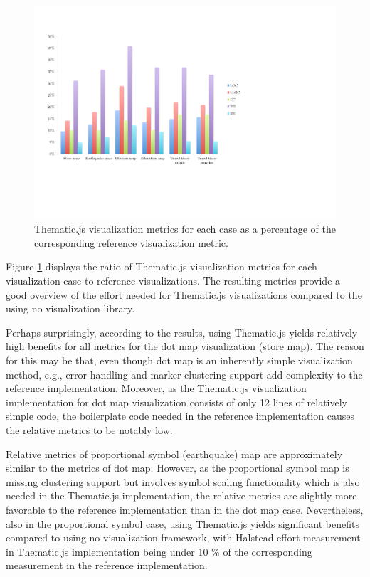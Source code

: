 \begin{figure}[htbp]
  \begin{center}
    \includegraphics[width=\textwidth]{images/evaluation-results.pdf}
    \caption{Thematic.js visualization metrics for each case as a percentage of the corresponding reference visualization metric.}
    \label{fig:evaluationchart}
  \end{center}
\end{figure}

Figure \ref{fig:evaluationchart} displays the ratio of Thematic.js visualization metrics for each visualization case to reference visualizations. The resulting metrics provide a good overview of the effort needed for Thematic.js visualizations compared to the using no visualization library.

Perhaps surprisingly, according to the results, using Thematic.js yields relatively high benefits for all metrics for the dot map visualization (store map). The reason for this may be that, even though dot map is an inherently simple visualization method, e.g., error handling and marker clustering support add complexity to the reference implementation. Moreover, as the Thematic.js visualization implementation for dot map visualization consists of only 12 lines of relatively simple code, the boilerplate code needed in the reference implementation causes the relative metrics to be notably low.

Relative metrics of proportional symbol (earthquake) map are approximately similar to the metrics of dot map. However, as the proportional symbol map is missing clustering support but involves symbol scaling functionality which is also needed in the Thematic.js implementation, the relative metrics are slightly more favorable to the reference implementation than in the dot map case. Nevertheless, also in the proportional symbol case, using Thematic.js yields significant benefits compared to using no visualization framework, with Halstead effort measurement in Thematic.js implementation being under 10 \% of the corresponding measurement in the reference implementation.

